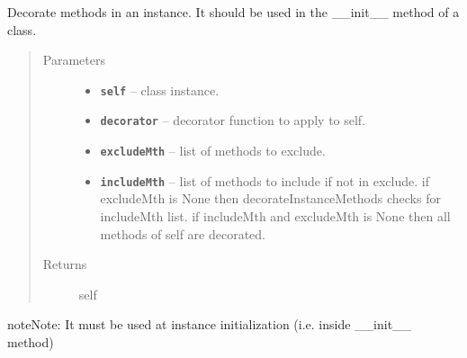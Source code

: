 \documentclass[letterpaper,10pt,english]{sphinxmanual}
\begin{document}
\begin{fulllineitems}
\label{RRtoolbox.lib:RRtoolbox.lib.root.decorateInstanceMethods}
Decorate methods in an instance. It should be used in the \_\_init\_\_ method of a class.
\begin{quote}\begin{description}
\item[{Parameters}] \leavevmode\begin{itemize}
\item {} 
\textbf{\texttt{self}} -- class instance.

\item {} 
\textbf{\texttt{decorator}} -- decorator function to apply to self.

\item {} 
\textbf{\texttt{excludeMth}} -- list of methods to exclude.

\item {} 
\textbf{\texttt{includeMth}} -- list of methods to include if not in exclude.
if excludeMth is None then decorateInstanceMethods checks for includeMth list.
if includeMth and excludeMth is None then all methods of self are decorated.

\end{itemize}

\item[{Returns}] \leavevmode
self

\end{description}\end{quote}

\begin{notice}{note}{Note:}
It must be used at instance initialization (i.e. inside \_\_init\_\_ method)
\end{notice}

\end{fulllineitems}

\end{document}
